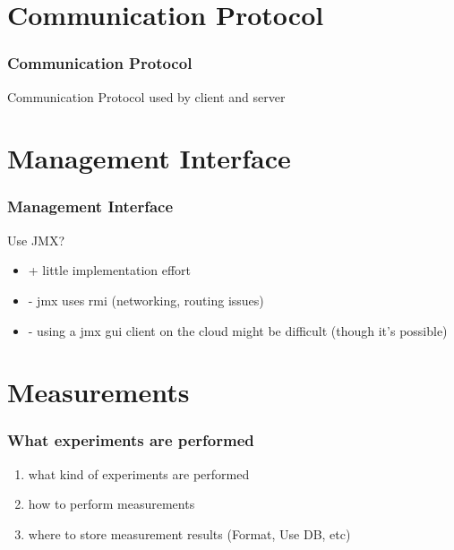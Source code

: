 \documentclass{beamer}
\begin{document}
\section{Communication Protocol}
\begin{frame}
\frametitle{Communication Protocol}
Communication Protocol used by client and server
\end{frame}



\section{Management Interface}
\begin{frame}
\frametitle{Management Interface}
Use JMX?

\begin{itemize}

\item + little implementation effort
\item - jmx uses rmi (networking, routing issues)
\item - using a jmx gui client on the cloud might be difficult (though it's possible)

\end{itemize}
\end{frame}


\section{Measurements}
\begin{frame}
\frametitle{What experiments are performed}


\begin{enumerate}
\item what kind of experiments are performed
\item how to perform measurements
\item where to store measurement results (Format, Use DB, etc)
\end{enumerate}

\end{frame}
\end{document}

